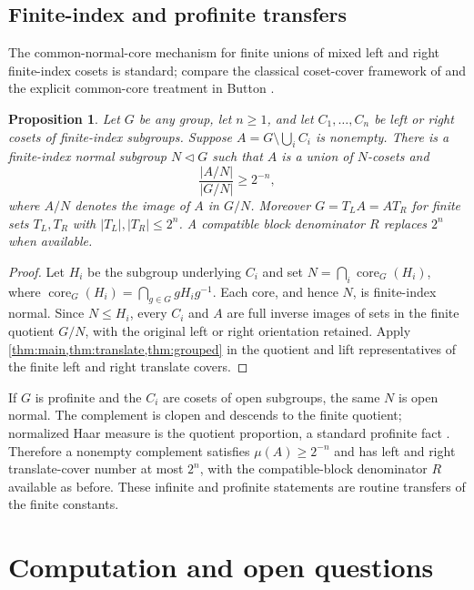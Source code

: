 \documentclass[11pt,a4paper]{amsart}
\newtheorem{proposition}[theorem]{Proposition}
\theoremstyle{definition}
\theoremstyle{remark}
\newcommand{\core}{\operatorname{core}}
\begin{document}
\subsection{Finite-index and profinite transfers}
The common-normal-core mechanism for finite unions of mixed left and right
finite-index cosets is standard; compare the classical coset-cover framework
of \cite{Neumann1954} and the explicit common-core treatment in Button
\cite[Propositions~2.4--2.6]{Button2015}.

\begin{proposition}\label{prop:finite-index}
Let $G$ be any group, let $n\ge1$, and let $C_1,\ldots,C_n$ be left or right cosets of
finite-index subgroups.  Suppose
$A=G\setminus\bigcup_iC_i$ is nonempty.  There is a finite-index normal
subgroup $N\triangleleft G$ such that $A$ is a union of $N$-cosets and
\[
  \frac{|A/N|}{|G/N|}\ge2^{-n},
\]
where $A/N$ denotes the image of $A$ in $G/N$.
Moreover $G=T_LA=AT_R$ for finite sets $T_L,T_R$ with
$|T_L|,|T_R|\le2^n$.  A compatible block denominator $R$ replaces $2^n$ when
available.
\end{proposition}

\begin{proof}
Let $H_i$ be the subgroup underlying $C_i$ and set
$N=\bigcap_i\core_G(H_i)$, where
$\core_G(H_i)=\bigcap_{g\in G}gH_ig^{-1}$.  Each core, and hence $N$, is
finite-index normal.  Since $N\le H_i$, every $C_i$ and $A$ are full inverse
images of sets in the finite quotient $G/N$, with the original left or right
orientation retained.  Apply \cref{thm:main,thm:translate,thm:grouped} in the
quotient and lift representatives of the finite left and right translate
covers.
\end{proof}

If $G$ is profinite and the $C_i$ are cosets of open subgroups, the same $N$ is
open normal.  The complement is clopen and descends to the finite quotient;
normalized Haar measure is the quotient proportion, a standard profinite fact
\cite[pp.~24--25]{Segal2007}.  Therefore a nonempty complement satisfies
$\mu(A)\ge2^{-n}$ and has left and right translate-cover number at most $2^n$,
with the compatible-block denominator $R$ available as before.  These infinite
and profinite statements are routine transfers of the finite constants.

\section{Computation and open questions}
\end{document}
